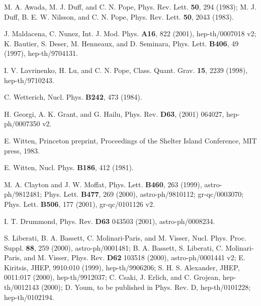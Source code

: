 \documentclass[a4paper,12pt]{article}
\begin{document}
\begin{thebibliography}{100}
 M. A. Awada, M. J. Duff, and C. N. Pope, Phys. Rev. Lett.
{\bf 50}, 294 (1983); M. J. Duff, B. E. W. Nilsson, and C. N. Pope, Phys.
Rev. Lett. {\bf 50}, 2043 (1983).

 J. Maldacena, C. Nunez, Int. J. Mod. Phys. {\bf A16},
822 (2001), hep-th/0007018 v2; K. Bautier, S. Deser, M. Henneaux, and D.
Seminara, Phys. Lett. {\bf B406}, 49 (1997), hep-th/9704131.

 I. V. Lavrinenko, H. Lu, and C. N. Pope, Class. Quant.
Grav. {\bf 15}, 2239 (1998), hep-th/9710243.

 C. Wetterich, Nucl. Phys. {\bf B242}, 473 (1984).

 H. Georgi, A. K. Grant, and G. Hailu, Phys. Rev. {\bf
D63}, (2001) 064027, hep-ph/0007350 v2.

 E. Witten, Princeton preprint, Proceedings of the
Shelter Island Conference, MIT press, 1983.

 E. Witten, Nucl. Phys. {\bf B186}, 412 (1981).

 M. A. Clayton and J. W. Moffat, Phys. Lett. {\bf B460},
263 (1999), astro-ph/9812481; Phys. Lett. {\bf B477}, 269 (2000),
astro-ph/9810112; gr-qc/0003070; Phys. Lett. {\bf B506}, 177
(2001), gr-qc/0101126 v2.

 I. T. Drummond, Phys. Rev. {\bf D63}
043503 (2001), astro-ph/0008234.

 S. Liberati, B. A.
Bassett, C. Molinari-Paris, and M. Visser, Nucl. Phys. Proc. Suppl. {\bf
88}, 259 (2000), astro-ph/0001481; B. A. Bassett, S. Liberati, C.
Molinari-Paris, and M. Visser, Phys. Rev. {\bf D62} 103518 (2000),
astro-ph/0001441 v2; E. Kiritsis, JHEP, 9910:010 (1999), hep-th/9906206;
S. H. S. Alexander, JHEP, 0011:017 (2000), hep-th/9912037; C. Csaki, J.
Erlich, and C. Grojean, hep-th/0012143 (2000); D. Youm, to be published in
Phys. Rev. D, hep-th/0101228; hep-th/0102194.

\end{thebibliography}
\end{document}
